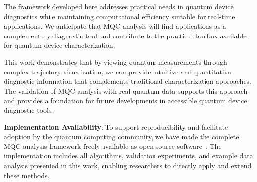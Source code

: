 The framework developed here addresses practical needs in quantum device diagnostics while maintaining computational efficiency suitable for real-time applications. We anticipate that MQC analysis will find applications as a complementary diagnostic tool and contribute to the practical toolbox available for quantum device characterization.

This work demonstrates that by viewing quantum measurements through complex trajectory visualization, we can provide intuitive and quantitative diagnostic information that complements traditional characterization approaches. The validation of MQC analysis with real quantum data supports this approach and provides a foundation for future developments in accessible quantum device diagnostic tools.

\textbf{Implementation Availability}: To support reproducibility and facilitate adoption by the quantum computing community, we have made the complete MQC analysis framework freely available as open-source software~\cite{github_mqc_analysis}. The implementation includes all algorithms, validation experiments, and example data analysis presented in this work, enabling researchers to directly apply and extend these methods.